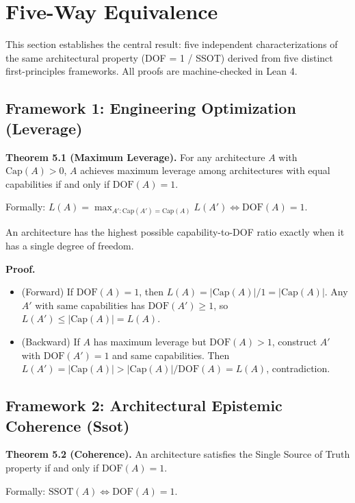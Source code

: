 \section{Five-Way Equivalence}\label{five-way-equivalence}

This section establishes the central result: five independent characterizations of the same architectural property (DOF = 1 / SSOT) derived from five distinct first-principles frameworks. All proofs are machine-checked in Lean 4.

\subsection{Framework 1: Engineering Optimization (Leverage)}

\begin{formal}
\textbf{Theorem 5.1 (Maximum Leverage).} For any architecture $A$ with $\text{Cap}(A) > 0$, $A$ achieves maximum leverage among architectures with equal capabilities if and only if $\text{DOF}(A) = 1$.

Formally: $L(A) = \max_{A': \text{Cap}(A')=\text{Cap}(A)} L(A') \iff \text{DOF}(A) = 1$.
\end{formal}

\begin{informal}
An architecture has the highest possible capability-to-DOF ratio exactly when it has a single degree of freedom.
\end{informal}

\textbf{Proof.} 
\begin{itemize}
\item (Forward) If $\text{DOF}(A) = 1$, then $L(A) = |\text{Cap}(A)|/1 = |\text{Cap}(A)|$. Any $A'$ with same capabilities has $\text{DOF}(A') \geq 1$, so $L(A') \leq |\text{Cap}(A)| = L(A)$.
\item (Backward) If $A$ has maximum leverage but $\text{DOF}(A) > 1$, construct $A'$ with $\text{DOF}(A') = 1$ and same capabilities. Then $L(A') = |\text{Cap}(A)| > |\text{Cap}(A)|/\text{DOF}(A) = L(A)$, contradiction.
\end{itemize}


\subsection{Framework 2: Architectural Epistemic Coherence (Ssot)}

\begin{formal}
\textbf{Theorem 5.2 (Coherence).} An architecture satisfies the Single Source of Truth property if and only if $\text{DOF}(A) = 1$.

Formally: $\text{SSOT}(A) \iff \text{DOF}(A) = 1$.
\end{formal}

